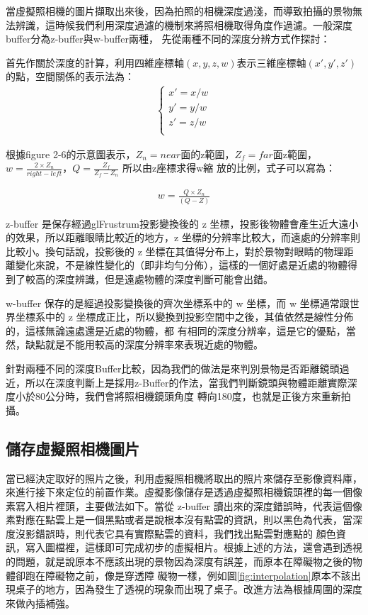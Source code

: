 	當虛擬照相機的圖片擷取出來後，因為拍照的相機深度過淺，而導致拍攝的景物無法辨識，這時候我們利用深度過濾的機制來將照相機取得角度作過濾。一般深度buffer分為z-buffer與w-buffer兩種，
	先從兩種不同的深度分辨方式作探討：
	
	首先作關於深度的計算，利用四維座標軸$(x,y,z,w)$表示三維座標軸$(x',y',z')$的點，空間關係的表示法為：
	\begin{align}
		\left\{
		\begin{array}{ccc}
		x' = x /w \\
		y' = y /w \\
		z' = z /w \\
		\end{array}
		\right.
	\end{align}
	
	根據figure 2-6的示意圖表示，$Z_n = near$面的z範圍，$Z_f = far$面z範圍，$w = \frac{2 \times Z_n}{right-left}$，$Q = \frac{Z_f}{Z_f - Z_n}$ 所以由z座標求得w縮
	放的比例，式子可以寫為：
		
	\begin{align}
		w = \frac{Q\times Z_n}{(Q-Z)}
	\end{align}			
	
	z-buffer 是保存經過glFrustrum投影變換後的 z 坐標，投影後物體會產生近大遠小的效果，所以距離眼睛比較近的地方，z 坐標的分辨率比較大，而遠處的分辨率則比較小。換句話說，投影後的
    z 坐標在其值得分布上，對於景物對眼睛的物理距離變化來說，不是線性變化的（即非均勻分佈），這樣的一個好處是近處的物體得到了較高的深度辨識，但是遠處物體的深度判斷可能會出錯。 
    
    w-buffer 保存的是經過投影變換後的齊次坐標系中的 w 坐標，而 w 坐標通常跟世界坐標系中的 z 坐標成正比，所以變換到投影空間中之後，其值依然是線性分佈的，這樣無論遠處還是近處的物體，都
    有相同的深度分辨率，這是它的優點，當然，缺點就是不能用較高的深度分辨率來表現近處的物體。
    
    針對兩種不同的深度Buffer比較，因為我們的做法是來判別景物是否距離鏡頭過近，所以在深度判斷上是採用z-Buffer的作法，當我們判斷鏡頭與物體距離實際深度小於80公分時，我們會將照相機鏡頭角度
    轉向180度，也就是正後方來重新拍攝。
    

\subsection{儲存虛擬照相機圖片}
%
	當已經決定取好的照片之後，利用虛擬照相機將取出的照片來儲存至影像資料庫，來進行接下來定位的前置作業。虛擬影像儲存是透過虛擬照相機鏡頭裡的每一個像素寫入相片裡頭，主要做法如下。當從 
	z-buffer 讀出來的深度錯誤時，代表這個像素對應在點雲上是一個黑點或者是說根本沒有點雲的資訊，則以黑色為代表，當深度沒影錯誤時，則代表它具有實際點雲的資料，我們找出點雲對應點的
	顏色資訊，寫入圖檔裡，這樣即可完成初步的虛擬相片。根據上述的方法，還會遇到透視的問題，就是說原本不應該出現的景物因為深度有誤差，而原本在障礙物之後的物體卻跑在障礙物之前，像是穿透障
	礙物一樣，例如圖\ref{fig:interpolation}原本不該出現桌子的地方，因為發生了透視的現象而出現了桌子。改進方法為根據周圍的深度來做內插補強。
	
